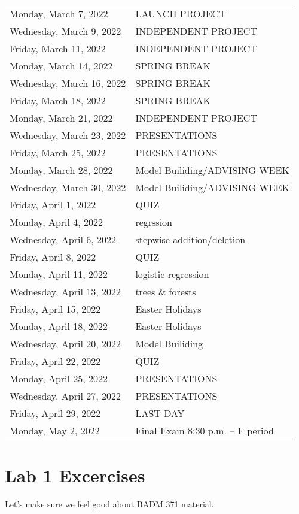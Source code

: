 \documentclass[
]{book}
\begin{document}
\begin{longtable}[]{@{}
  >{\raggedright\arraybackslash}p{}
  >{\raggedright\arraybackslash}p{}@{}}
Monday, March 7, 2022 & LAUNCH PROJECT \\
Wednesday, March 9, 2022 & INDEPENDENT PROJECT \\
Friday, March 11, 2022 & INDEPENDENT PROJECT \\
Monday, March 14, 2022 & SPRING BREAK \\
Wednesday, March 16, 2022 & SPRING BREAK \\
Friday, March 18, 2022 & SPRING BREAK \\
Monday, March 21, 2022 & INDEPENDENT PROJECT \\
Wednesday, March 23, 2022 & PRESENTATIONS \\
Friday, March 25, 2022 & PRESENTATIONS \\
Monday, March 28, 2022 & Model Builiding/ADVISING WEEK \\
Wednesday, March 30, 2022 & Model Builiding/ADVISING WEEK \\
Friday, April 1, 2022 & QUIZ \\
Monday, April 4, 2022 & regrssion \\
Wednesday, April 6, 2022 & stepwise addition/deletion \\
Friday, April 8, 2022 & QUIZ \\
Monday, April 11, 2022 & logistic regression \\
Wednesday, April 13, 2022 & trees \& forests \\
Friday, April 15, 2022 & Easter Holidays \\
Monday, April 18, 2022 & Easter Holidays \\
Wednesday, April 20, 2022 & Model Builiding \\
Friday, April 22, 2022 & QUIZ \\
Monday, April 25, 2022 & PRESENTATIONS \\
Wednesday, April 27, 2022 & PRESENTATIONS \\
Friday, April 29, 2022 & LAST DAY \\
Monday, May 2, 2022 & Final Exam 8:30 p.m. -- F period \\
\bottomrule
\end{longtable}

\hypertarget{lab-1-excercises}{%
\chapter{Lab 1 Excercises}\label{lab-1-excercises}}

Let's make sure we feel good about BADM 371 material.
\end{document}
